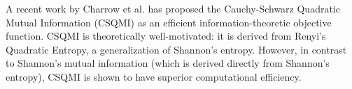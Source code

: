 A recent work by Charrow et al. \cite{} has proposed the Cauchy-Schwarz Quadratic Mutual
Information (CSQMI) as an efficient information-theoretic objective function. CSQMI is theoretically
well-motivated: it is derived from Renyi's Quadratic Entropy, a generalization of Shannon's entropy.
However, in contrast to Shannon's mutual information (which is derived directly
from Shannon's entropy), CSQMI is shown to have superior computational efficiency.

